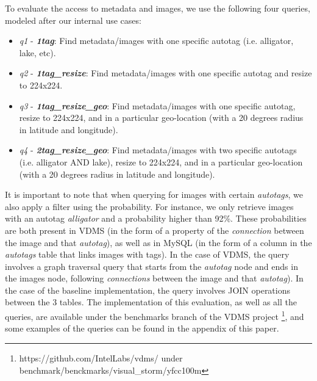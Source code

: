 To evaluate the access to metadata and images,
we use the following four queries, modeled after our internal use cases:
\begin{itemize}
\item \textit{q1} - {\bf {\em 1tag}}: Find metadata/images with one specific autotag (i.e. alligator, lake, etc).
\item \textit{q2} - {\bf {\em 1tag\_resize}}: Find metadata/images with one specific autotag and resize to 224x224.
\item \textit{q3} - {\bf {\em 1tag\_resize\_geo}}: Find metadata/images with one specific autotag, resize to 224x224, and in a particular geo-location (with a 20 degrees radius in latitude and longitude).
\item \textit{q4} - {\bf {\em 2tag\_resize\_geo}}: Find metadata/images with two specific autotags (i.e. alligator AND lake), resize to 224x224, and in a particular geo-location (with a 20 degrees radius in latitude and longitude).
\end{itemize}

It is important to note that when querying for images with certain
\textit{autotags}, we also apply a filter using the probability.
For instance, we only retrieve images with an autotag \textit{alligator}
and a probability higher than 92\%.
These probabilities are both present in VDMS (in the form of a property
of the \textit{connection} between the image and that \textit{autotag}),
as well as in MySQL (in the form of a column in the \textit{autotags} table
that links images with tags).
In the case of VDMS, the query involves a graph traversal query that starts
from the \textit{autotag} node and ends in the images node,
following \textit{connections} between the image and that \textit{autotag}).
In the case of the baseline implementation,
the query involves JOIN operations between the 3 tables.
The implementation of this evaluation, as well as all the queries, are available
under the benchmarks branch of the VDMS project
\footnote{https://github.com/IntelLabs/vdms/ under benchmark/benckmarks/visual\_storm/yfcc100m},
and some examples of the queries can be found in the appendix of this
paper.


